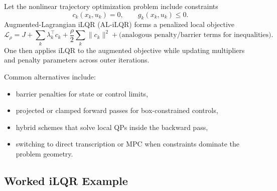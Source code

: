 \begin{definition}\label{def:l8-augmented-lagrangian-ilqr}
	Let the nonlinear trajectory optimization problem include constraints
	\[
		c_k(x_k,u_k)=0,
		\qquad
		g_k(x_k,u_k)\le 0.
	\]
	Augmented-Lagrangian iLQR (AL-iLQR) forms a penalized local objective
	\[
		\mathcal{L}_{\rho}
		=
		J
		+
		\sum_k \lambda_k^\top c_k
		+
		\frac{\rho}{2}\sum_k \|c_k\|^2
		+
		\text{(analogous penalty/barrier terms for inequalities)}.
	\]
	One then applies iLQR to the augmented objective while updating multipliers and penalty parameters across outer iterations.
\end{definition}

\begin{remark}
	Common alternatives include:
	\begin{itemize}
		\item barrier penalties for state or control limits,
		\item projected or clamped forward passes for box-constrained controls,
		\item hybrid schemes that solve local QPs inside the backward pass,
		\item switching to direct transcription or MPC when constraints dominate the problem geometry.
	\end{itemize}
\end{remark}

\subsection{Worked iLQR Example}
\label{sec:l8-worked-ilqr-example}


